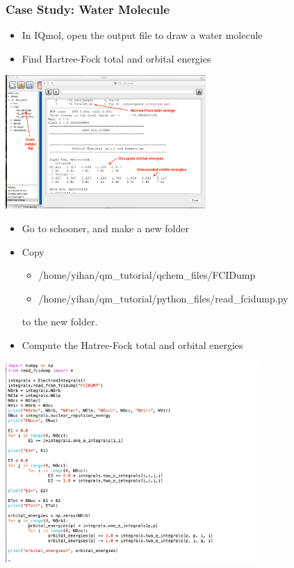 \documentclass[handout]{beamer} %
\begin{document}
\begin{frame}
\frametitle{Case Study: Water Molecule}
\begin{itemize}
\item In IQmol, open the output file to draw a water molecule
\item Find Hartree-Fock total and orbital energies
\end{itemize}
\begin{center}
\includegraphics[height=2.0in]{figures/iqmol-water3.png}
\end{center}
\end{frame}

\begin{frame}
\begin{itemize}
\item Go to schooner, and make a new folder 
\item Copy 
\begin{itemize}
\item /home/yihan/qm\_tutorial/qchem\_files/FCIDump
\item /home/yihan/qm\_tutorial/python\_files/read\_fcidump.py
\end{itemize}
to the new folder.
\item Compute the Hatree-Fock total and orbital energies  
\end{itemize}
\end{frame}

\begin{frame}
\includegraphics[height=3.0in]{figures/hf-energy-code.png}
\end{frame}
\end{document}
